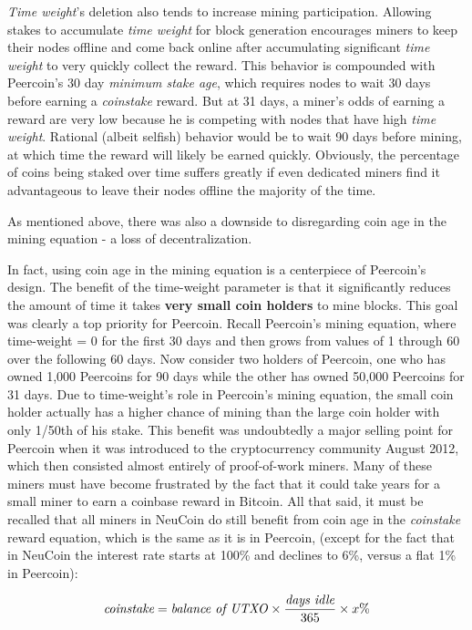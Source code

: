 \documentclass[a4paper,11pt]{article}
\begin{document}
\textit{Time weight}'s deletion also tends to increase mining participation. Allowing stakes to accumulate \textit{time weight} for block generation encourages miners to keep their nodes offline and come back online after accumulating significant \textit{time weight} to very quickly collect the reward. This behavior is compounded with Peercoin's 30 day \textit{minimum stake age}, which requires nodes to wait 30 days before earning a \textit{coinstake} reward. But at 31 days, a miner's odds of earning a reward are very low because he is competing with nodes that have high \textit{time weight}. Rational (albeit selfish) behavior would be to wait 90 days before mining, at which time the reward will likely be earned quickly. Obviously, the percentage of coins being staked over time suffers greatly if even dedicated miners find it advantageous to leave their nodes offline the majority of the time.

As mentioned above, there was also a downside to disregarding coin age in the mining equation - a loss of decentralization. 

In fact, using coin age in the mining equation is a centerpiece of Peercoin's design. The benefit of the time-weight parameter is that it significantly reduces the amount of time it takes \textbf{very small coin holders} to mine blocks. This goal was clearly a top priority for Peercoin. Recall Peercoin's mining equation, where time-weight = 0 for the first 30 days and then grows from values of 1 through 60 over the following 60 days. Now consider two holders of Peercoin, one who has owned 1,000 Peercoins for 90 days while the other has owned 50,000 Peercoins for 31 days. Due to time-weight's role in Peercoin's mining equation, the small coin holder actually has a higher chance of mining than the large coin holder with only 1/50th of his stake. This benefit was undoubtedly a major selling point for Peercoin when it was introduced to the cryptocurrency community August 2012, which then consisted almost entirely of proof-of-work miners. Many of these miners must have become frustrated by the fact that it could take years for a small miner to earn a coinbase reward in Bitcoin.
All that said, it must be recalled that all miners in NeuCoin do still benefit from coin age in the \textit{coinstake} reward equation, which is the same as it is in Peercoin, (except for the fact that in NeuCoin the interest rate starts at 100\% and declines to 6\%, versus a flat 1\% in Peercoin):

$$ \textit{coinstake} = \text{\textit{balance of \textit{UTXO}}} \times \frac{\text{\textit{days idle}}}{365} \times x\% $$
\end{document}
